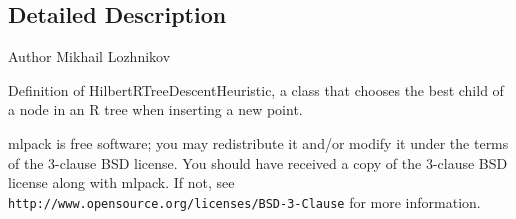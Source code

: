 \subsection{Detailed Description}
\begin{DoxyAuthor}{Author}
Mikhail Lozhnikov
\end{DoxyAuthor}
Definition of Hilbert\+R\+Tree\+Descent\+Heuristic, a class that chooses the best child of a node in an R tree when inserting a new point.

mlpack is free software; you may redistribute it and/or modify it under the terms of the 3-\/clause B\+SD license. You should have received a copy of the 3-\/clause B\+SD license along with mlpack. If not, see {\tt http\+://www.\+opensource.\+org/licenses/\+B\+S\+D-\/3-\/\+Clause} for more information. 